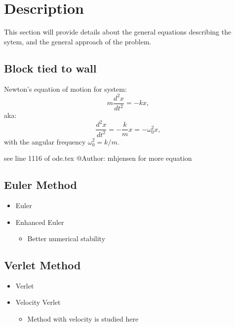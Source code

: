 \documentclass[12pt]{article}
\begin{document}
\section{Description}
This section will provide details about the general equations describing the sytem, and the general approach of the problem.

\subsection{Block tied to wall}
Newton's equation of motion for system:
\[
m\frac{d^2x}{dt^2}=-kx,
\]
aka:
\[
\frac{d^2x}{dt^2}=-\frac{k}{m}x=-\omega_0^2x,
\label{eq:newton1}
\]
with the angular frequency $\omega_0^2=k/m$.

see line 1116 of ode.tex @Author: mhjensen for more equation

\subsection{Euler Method}
\begin{itemize}
	\item Euler
	\item Enhanced Euler
		\begin{itemize}
			\item Better numerical stability
		\end{itemize}
\end{itemize}

\subsection{Verlet Method}
\begin{itemize}
	\item Verlet
	\item Velocity Verlet
		\begin{itemize}
			\item Method with velocity is studied here
		\end{itemize}
\end{itemize}
\end{document}
